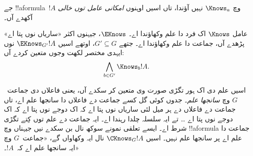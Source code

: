 \documentclass[../../../include/open-logic-section]{subfiles}
\begin{document}
جے !!a{formula}~$!A$ وچ $\Knows_a$ نہیں آؤندا، تاں اسیں اوہنوں
\emph{امکانی عامل توں خالی} آکھدے آں۔

\begin{defn}
  عامل $\Knows$ اک فرد دا علم وکھاؤندا اے۔ $\EKnows$، جیہنوں اکثر
  «ساریاں نوں پتا اے» پڑھدے آں، جماعت دا علم وکھاؤندا اے۔ جتھے
  $G' \subseteq G$، اوتھے اسیں $\EKnows_{G'} !A$ نوں
  ایہدی مختصر لکھت وجوں متعین کردے آں:
  \[\bigwedge_{b \in G'} \Knows_b !A.\]
\end{defn}

اسیں علم دی اک ہور تگڑی صورت وی متعین کر سکدے آں، یعنی فاعلاں
دی جماعت~$G$ وچ \emph{سانجھا علم}۔ جدوں کوئی گل کسے جماعت دے
فاعلاں دا سانجھا علم اے، تاں جماعت دے فاعلاں دے ہر میل لئی ساریاں
نوں پتا اے کہ اک دوجے نوں پتا اے کہ اک دوجے نوں پتا اے \dots
تے ایہ سلسلہ چلدا رہندا اے۔ ایہ جماعت دے علم توں کِتے تگڑی شرط اے۔
ایسے تعلقی نمونے سوکھ نال بن سکدے نیں جیہناں وچ !!a{formula} جماعت
دا علم اے پر سانجھا علم نہیں۔ اسیں $\CKnows_G !A$ نال ایہ وکھاواں گے،
«جماعت~$G$ وچ ایہ سانجھا علم اے کہ~$!A$۔»
\end{document}
